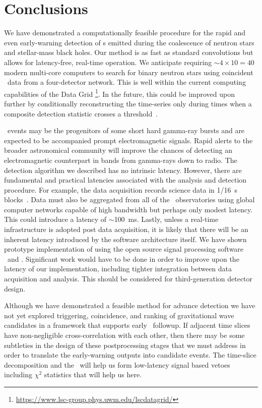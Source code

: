 \section{Conclusions}
\label{sec:conclusions}

We have demonstrated a computationally feasible procedure for the rapid and
even early-warning detection of \GW{}s emitted during the coalescence
of neutron stars and stellar-mass black holes. Our method is as fast as
standard \fft{} convolutions but allows for latency-free, real-time
operation.  We anticipate requiring $\sim 4 \times 10 = 40$ modern multi-core computers to
search for binary neutron stars using coincident \GW\ data from a four-detector network.
This is well within the current computing capabilities of the \LIGO{} Data Grid%
\footnote{\url{https://www.lsc-group.phys.uwm.edu/lscdatagrid/}}. In the future, this
could be improved upon further by conditionally reconstructing the \SNR{} time-series
only during times when a composite detection statistic crosses a
threshold~\citep{svd-compdetstat}.

\CBC\ events may be the progenitors of some short hard gamma-ray bursts and are
expected to be accompanied prompt electromagnetic signals.  Rapid
alerts to the broader astronomical community will improve the chances of
detecting an electromagnetic counterpart in bands from gamma-rays down to
radio.  The detection algorithm we described has no intrinsic latency.  However, there are
fundamental and practical latencies associated with the analysis and detection
procedure. For example, the \LIGO{} data acquisition records science data in 1/16~s
blocks~\citep{Bork2001}. Data must also be aggregated from all of the \GW\
observatories using global computer networks capable of high bandwidth but perhaps only
modest latency.  This could introduce a latency of $\sim$100~ms.  Lastly, unless a
real-time infrastructure is adopted post data acquisition, it is likely that there will be 
an inherent latency introduced by the software architecture itself.  We have shown 
prototype implementation of \lloid{} using the open source signal processing software
\gstreamer\ and \gstlal. Significant work would have to be done in order to
improve upon the latency of our implementation, including tighter integration between
data acquisition and analysis. This should be considered for third-generation detector
design.

Although we have demonstrated a feasible method for advance detection we have
not yet explored triggering, coincidence, and ranking of gravitational wave
candidates in a framework that supports early \EM\ followup.  If adjacent time slices
have non-negligible cross-correlation with each other, then there may be some
subtleties in the design of these postprocessing stages that we must address in order
to translate the early-warning outputs into candidate events.  The time-slice
decomposition and the \SVD\ will help us form low-latency signal based vetoes
including $\chi^2$ statistics that will help us here.

